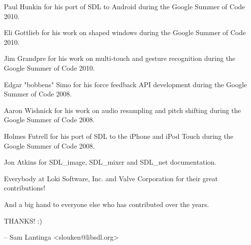 \begin{DoxyItemize}
\item Paul Hunkin for his port of SDL to Android during the Google Summer of Code 2010.
\item Eli Gottlieb for his work on shaped windows during the Google Summer of Code 2010.
\item Jim Grandpre for his work on multi-\/touch and gesture recognition during the Google Summer of Code 2010.
\item Edgar "{}bobbens"{} Simo for his force feedback API development during the Google Summer of Code 2008.
\item Aaron Wishnick for his work on audio resampling and pitch shifting during the Google Summer of Code 2008.
\item Holmes Futrell for his port of SDL to the i\+Phone and i\+Pod Touch during the Google Summer of Code 2008.
\item Jon Atkins for SDL\+\_\+image, SDL\+\_\+mixer and SDL\+\_\+net documentation.
\item Everybody at Loki Software, Inc. and Valve Corporation for their great contributions!

And a big hand to everyone else who has contributed over the years.
\end{DoxyItemize}

THANKS! :\+) \begin{DoxyVerb}-- Sam Lantinga <slouken@libsdl.org>
\end{DoxyVerb}
 